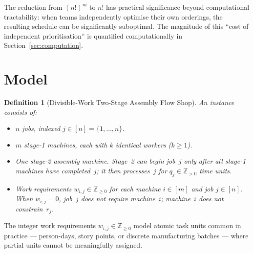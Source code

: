 \documentclass[11pt,titlepage]{article}
\newtheorem{definition}[theorem]{Definition}
\begin{document}
\noindent
The reduction from $(n!)^m$ to $n!$ has practical significance
beyond computational tractability: when teams independently optimise
their own orderings, the resulting schedule can be significantly
suboptimal.  The magnitude of this ``cost of independent
prioritisation'' is quantified computationally in
Section~\ref{sec:computation}.

\section{Model}
\label{sec:model}

\begin{definition}[Divisible-Work Two-Stage Assembly Flow Shop]
\label{def:model}
An instance consists of:
\begin{itemize}
  \item $n$ jobs, indexed $j \in [n] = \{1, \ldots, n\}$.
  \item $m$ stage-1 machines, each with $k$ identical workers
        ($k \geq 1$).
  \item One stage-2 assembly machine. Stage~2 can begin
        job~$j$ only after all stage-1 machines have
        completed~$j$; it then processes~$j$ for
        $q_j \in \mathbb{Z}_{> 0}$ time units.
  \item Work requirements $w_{i,j} \in \mathbb{Z}_{\geq 0}$ for
        each machine $i \in [m]$ and job $j \in [n]$. When
        $w_{i,j} = 0$, job~$j$ does not require machine~$i$;
        machine~$i$ does not constrain~$r_j$.
\end{itemize}
\end{definition}

\noindent
The integer work requirements $w_{i,j} \in \mathbb{Z}_{\geq 0}$
model atomic task units common in practice --- person-days, story
points, or discrete manufacturing batches --- where partial units
cannot be meaningfully assigned.
\end{document}
